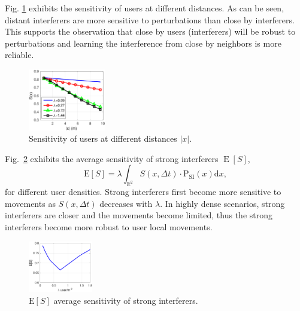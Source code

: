 \documentclass[10pt, conference, letterpaper]{IEEEtran}
\DeclareMathOperator*{\E}{\mathrm{E}}
\begin{document}

Fig. \ref{fig:Channel_sensitivity} exhibits the sensitivity of users at different distances. 
As can be seen, distant interferers are more sensitive to perturbations than close by interferers. 
This supports the observation that close by users (interferers) will be robust to perturbations and learning the interference from close by neighbors is more reliable. 

\begin{figure}
	\centering
	\includegraphics[width = 0.3\textwidth]{Channel_sensitivity.pdf}
	\caption{Sensitivity of users at different distances $|x|$.}
	\label{fig:Channel_sensitivity}
\end{figure}

Fig.~\ref{fig:Channel_sensitivity_average} exhibits the average sensitivity of strong interferers $\E[S]$,
\begin{equation*}
\mathrm{E}[S] = \lambda\int_{\mathbb{R}^2}S(x,\Delta t)\cdot \mathrm{P_{SI}}(x) \mathrm{d}x,
\end{equation*}
for different user densities.
Strong interferers first become more sensitive to movements as $S(x, \Delta t)$ decreases with $\lambda$. 
In highly dense scenarios, strong interferers are closer and the movements become limited, thus the strong interferers become more robust to user local movements.

\begin{figure}
	\centering
	\includegraphics[width = 0.25\textwidth]{Channel_sensitivity_average.pdf}
	\caption{$\mathrm{E}[S]$ average sensitivity of strong interferers.}
	\label{fig:Channel_sensitivity_average}
\end{figure}
\end{document}
